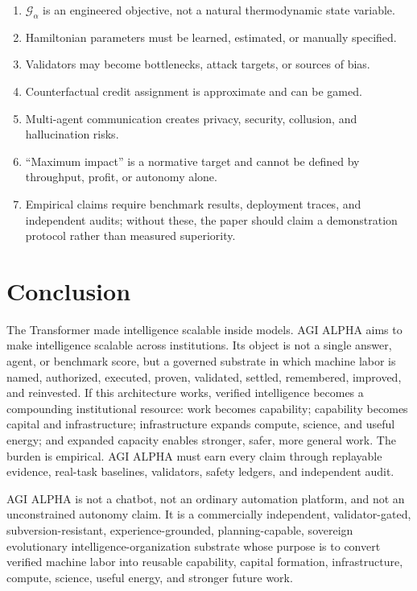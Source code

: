 \documentclass[
  11pt,
]{article}
\providecommand{\tightlist}{%
  \setlength{\itemsep}{0pt}\setlength{\parskip}{0pt}}
\begin{document}
\begin{enumerate}
\def\labelenumi{\arabic{enumi}.}
\tightlist
\item
  \(\mathcal{G}_{\alpha}\) is an engineered objective, not a natural
  thermodynamic state variable.
\item
  Hamiltonian parameters must be learned, estimated, or manually
  specified.
\item
  Validators may become bottlenecks, attack targets, or sources of bias.
\item
  Counterfactual credit assignment is approximate and can be gamed.
\item
  Multi-agent communication creates privacy, security, collusion, and
  hallucination risks.
\item
  ``Maximum impact'' is a normative target and cannot be defined by
  throughput, profit, or autonomy alone.
\item
  Empirical claims require benchmark results, deployment traces, and
  independent audits; without these, the paper should claim a
  demonstration protocol rather than measured superiority.
\end{enumerate}

\section{Conclusion}\label{conclusion}

The Transformer made intelligence scalable inside models. AGI ALPHA aims
to make intelligence scalable across institutions. Its object is not a
single answer, agent, or benchmark score, but a governed substrate in
which machine labor is named, authorized, executed, proven, validated,
settled, remembered, improved, and reinvested. If this architecture
works, verified intelligence becomes a compounding institutional
resource: work becomes capability; capability becomes capital and
infrastructure; infrastructure expands compute, science, and useful
energy; and expanded capacity enables stronger, safer, more general
work. The burden is empirical. AGI ALPHA must earn every claim through
replayable evidence, real-task baselines, validators, safety ledgers,
and independent audit.

AGI ALPHA is not a chatbot, not an ordinary automation platform, and not
an unconstrained autonomy claim. It is a commercially independent,
validator-gated, subversion-resistant, experience-grounded,
planning-capable, sovereign evolutionary intelligence-organization
substrate whose purpose is to convert verified machine labor into
reusable capability, capital formation, infrastructure, compute,
science, useful energy, and stronger future work.
\end{document}
